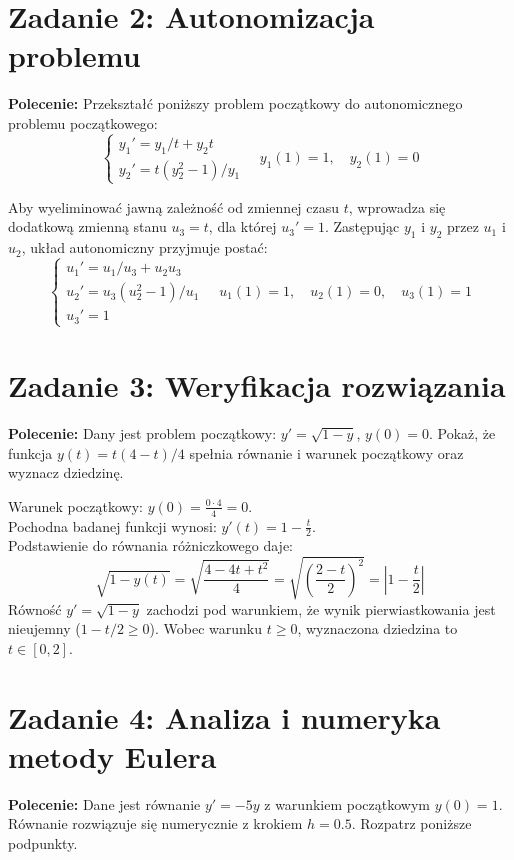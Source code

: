 \documentclass[12pt, a4paper]{article}
\begin{document}
\section{Zadanie 2: Autonomizacja problemu}
\textbf{Polecenie:} Przekształć poniższy problem początkowy do autonomicznego problemu początkowego:
\[
  \begin{cases}
    y_1' = y_1/t + y_2 t \\
    y_2' = t(y_2^2 - 1)/y_1
  \end{cases} \quad y_1(1) = 1, \quad y_2(1) = 0
\]

Aby wyeliminować jawną zależność od zmiennej czasu $t$, wprowadza się dodatkową zmienną stanu $u_3 = t$, dla której $u_3' = 1$. Zastępując $y_1$ i $y_2$ przez $u_1$ i $u_2$, układ autonomiczny przyjmuje postać:
\[
  \begin{cases}
    u_1' = u_1/u_3 + u_2 u_3 \\
    u_2' = u_3(u_2^2 - 1)/u_1 \\
    u_3' = 1
  \end{cases} \quad u_1(1)=1, \quad u_2(1)=0, \quad u_3(1)=1
\]

\section{Zadanie 3: Weryfikacja rozwiązania}
\textbf{Polecenie:} Dany jest problem początkowy: $y' = \sqrt{1 - y}$, $y(0) = 0$. Pokaż, że funkcja $y(t) = t(4 - t)/4$ spełnia równanie i warunek początkowy oraz wyznacz dziedzinę.

Warunek początkowy: $y(0) = \frac{0 \cdot 4}{4} = 0$. \\
Pochodna badanej funkcji wynosi: $y'(t) = 1 - \frac{t}{2}$. \\
Podstawienie do równania różniczkowego daje:
\[
  \sqrt{1 - y(t)} = \sqrt{\frac{4 - 4t + t^2}{4}} = \sqrt{\left(\frac{2-t}{2}\right)^2} = \left| 1 - \frac{t}{2} \right|
\]
Równość $y' = \sqrt{1-y}$ zachodzi pod warunkiem, że wynik pierwiastkowania jest nieujemny ($1 - t/2 \geq 0$). Wobec warunku $t \geq 0$, wyznaczona dziedzina to $t \in [0, 2]$.

\section{Zadanie 4: Analiza i numeryka metody Eulera}
\textbf{Polecenie:} Dane jest równanie $y' = -5y$ z warunkiem początkowym $y(0) = 1$. Równanie rozwiązuje się numerycznie z krokiem $h = 0.5$. Rozpatrz poniższe podpunkty.
\end{document}
